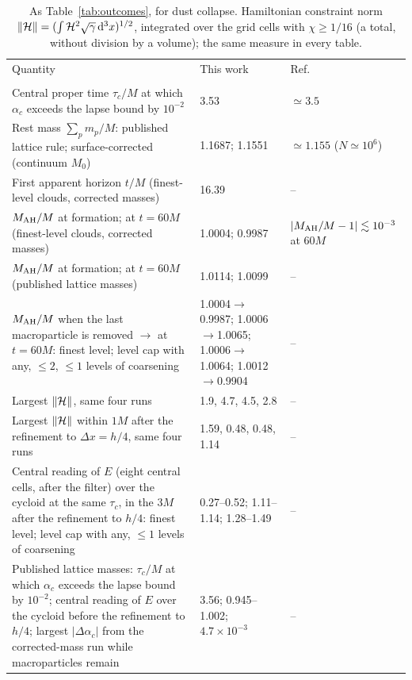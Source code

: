 \begin{table}
\caption{As Table~\ref{tab:outcomes}, for dust collapse. Hamiltonian constraint norm $\|\mathcal{H}\|=(\int\mathcal{H}^2\sqrt{\gamma}\,\mathrm{d}^3x)^{1/2}$, integrated over the grid cells with $\chi\ge1/16$ (a total, without division by a volume); the same measure in every table.}
\label{tab:outcomes_dust}
\footnotesize
\setlength{\tabcolsep}{3pt}
\begin{ruledtabular}
\begin{tabular}{p{}p{}p{}}
Quantity & This work & Ref.~\cite{Wu:2026nrpic} \tabularnewline
\colrule
\multicolumn{3}{l}{\textit{Dust collapse on a lattice}} \tabularnewline
\raggedright Central proper time $\tau_c/M$ at which $\alpha_c$ exceeds the lapse bound by $10^{-2}$ & \raggedright 3.53 & \raggedright $\simeq3.5$ \tabularnewline
\raggedright Rest mass $\sum_p m_p/M$: published lattice rule; surface-corrected (continuum $M_0$) & \raggedright 1.1687; 1.1551 & \raggedright $\simeq1.155$ ($N\simeq10^6$) \tabularnewline
\raggedright First apparent horizon $t/M$ (finest-level clouds, corrected masses) & \raggedright 16.39 & \raggedright -- \tabularnewline
\raggedright $M_{\rm AH}/M$ at formation; at $t=60M$ (finest-level clouds, corrected masses) & \raggedright 1.0004; 0.9987 & \raggedright $|M_{\rm AH}/M-1|\lesssim10^{-3}$ at $60M$ \tabularnewline
\raggedright $M_{\rm AH}/M$ at formation; at $t=60M$ (published lattice masses) & \raggedright 1.0114; 1.0099 & \raggedright -- \tabularnewline
\raggedright $M_{\rm AH}/M$ when the last macroparticle is removed $\to$ at $t=60M$: finest level; level cap with any, $\le2$, $\le1$ levels of coarsening & \raggedright 1.0004$\to$0.9987; 1.0006$\to$1.0065; 1.0006$\to$1.0064; 1.0012$\to$0.9904 & \raggedright -- \tabularnewline
\raggedright Largest $\|\mathcal{H}\|$, same four runs & \raggedright 1.9, 4.7, 4.5, 2.8 & \raggedright -- \tabularnewline
\raggedright Largest $\|\mathcal{H}\|$ within $1M$ after the refinement to $\Delta x=h/4$, same four runs & \raggedright 1.59, 0.48, 0.48, 1.14 & \raggedright -- \tabularnewline
\raggedright Central reading of $E$ (eight central cells, after the filter) over the cycloid at the same $\tau_c$, in the $3M$ after the refinement to $h/4$: finest level; level cap with any, $\le1$ levels of coarsening & \raggedright 0.27--0.52; 1.11--1.14; 1.28--1.49 & \raggedright -- \tabularnewline
\raggedright Published lattice masses: $\tau_c/M$ at which $\alpha_c$ exceeds the lapse bound by $10^{-2}$; central reading of $E$ over the cycloid before the refinement to $h/4$; largest $|\Delta\alpha_c|$ from the corrected-mass run while macroparticles remain & \raggedright 3.56; 0.945--1.002; $4.7\times10^{-3}$ & \raggedright -- \tabularnewline

\end{tabular}
\end{ruledtabular}
\end{table}
